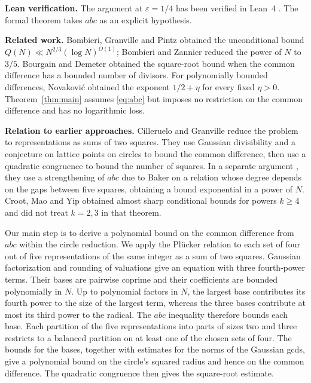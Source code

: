 \documentclass[11pt,reqno]{amsart}
\begin{document}
\medskip
\noindent\textbf{Lean verification.}
The argument at $\varepsilon=1/4$ has been verified in Lean~4
\cite{RudinLean}. The formal theorem takes $abc$ as an explicit hypothesis.

\medskip
\noindent\textbf{Related work.}
Bombieri, Granville and Pintz \cite{BGP} obtained the unconditional bound
$Q(N)\ll N^{2/3}(\log N)^{O(1)}$; Bombieri and Zannier \cite{BZ}
reduced the power of $N$ to $3/5$. Bourgain and Demeter \cite{BD} obtained
the square-root bound when the common difference has a bounded number of
divisors. For polynomially bounded differences, Novakovi\'c
\cite[Theorem~1.4]{Novakovic} obtained the exponent $1/2+\eta$ for every
fixed $\eta>0$. Theorem~\ref{thm:main} assumes \eqref{eq:abc} but imposes
no restriction on the common difference and has no logarithmic loss.

\medskip
\noindent\textbf{Relation to earlier approaches.}
Cilleruelo and Granville \cite[Section~5, Theorem~12]{CG} reduce the problem
to representations as sums of two squares. They use Gaussian divisibility
and a conjecture on lattice points on circles to bound the common difference,
then use a quadratic congruence to bound the number of squares. In a
separate argument \cite[Section~9]{CG}, they use a strengthening of $abc$
due to Baker on a relation whose degree depends on the gaps between five
squares, obtaining a bound exponential in a power of $N$.
Croot, Mao and Yip
\cite[Theorem~2.5 and Remark~2.6]{CMY} obtained almost sharp conditional
bounds for powers $k\ge4$ and did not treat $k=2,3$ in that theorem.

Our main step is to derive a polynomial bound on the common difference
from $abc$ within the circle reduction. We apply the Pl\"ucker relation
to each set of four out of five representations of the same integer as a
sum of two squares. Gaussian factorization and rounding of valuations
give an equation with three fourth-power terms. Their bases are pairwise
coprime and their coefficients are bounded polynomially in $N$. Up to
polynomial factors in $N$, the largest base contributes its fourth power
to the size of the largest term, whereas the three bases contribute at
most its third power to the radical. The $abc$ inequality therefore
bounds each base. Each partition of the five representations into parts
of sizes two and three restricts to a balanced partition on at least one
of the chosen sets of four. The bounds for the bases, together with
estimates for the norms of the Gaussian gcds, give a polynomial bound on
the circle's squared radius and hence on the common difference. The
quadratic congruence then gives the square-root estimate.
\end{document}
